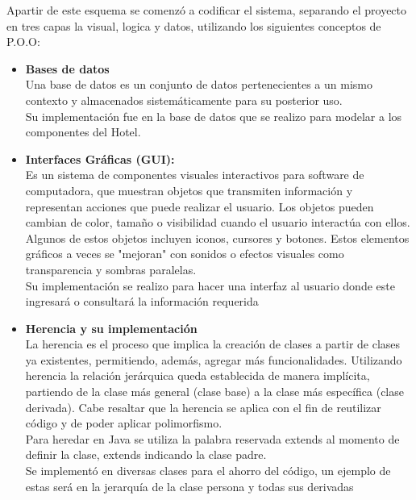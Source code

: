 \documentclass[a4paper,12pt]{article}
\begin{document}
\begin{flushleft}
\textsf{Apartir de este esquema se comenzó a codificar el sistema, separando el proyecto en tres capas la visual, logica y datos, utilizando los siguientes conceptos de P.O.O:\\}

\begin{itemize}
\item{\textbf{Bases de datos}}
\vspace{0.3cm}
\textsf{\\Una base de datos es un conjunto de datos pertenecientes a un mismo contexto y almacenados sistemáticamente para su posterior uso.\\\vspace{0.3cm}Su implementación fue en la base de datos que se realizo para modelar a los componentes del Hotel.}
\item{\textbf{Interfaces Gráficas (GUI):\\ }}
\vspace{0.3cm}
\textsf{Es un sistema de componentes visuales interactivos para software de computadora, que muestran objetos que transmiten información y representan acciones que puede realizar el usuario. Los objetos pueden cambian de color, tamaño o visibilidad cuando el usuario interactúa con ellos. Algunos de estos objetos incluyen iconos, cursores y botones. Estos elementos gráficos a veces se "mejoran" con sonidos o efectos visuales como transparencia y sombras paralelas.\\\vspace{0.3cm}Su implementación se realizo para hacer una interfaz al usuario donde este ingresará o consultará la información requerida}
\item{\textbf{Herencia y su implementación}}
\vspace{0.3cm}
\textsf{\\La herencia es el proceso que implica la creación de clases a partir de clases ya existentes, permitiendo, además, agregar más funcionalidades. Utilizando herencia la relación jerárquica queda establecida de manera implícita, partiendo de la clase más general (clase base) a la clase más específica (clase derivada). Cabe resaltar que la herencia se aplica con el fin de reutilizar código y de poder aplicar polimorfismo.\vspace{0.5cm}\\Para heredar en Java se utiliza la palabra reservada extends al momento de definir la clase, extends indicando la clase padre.\\\vspace{0.3cm}Se implementó en diversas clases para el ahorro del código, un ejemplo de estas será en la jerarquía de la clase persona y todas sus derivadas}

\end{itemize}
\end{flushleft}
\end{document}
